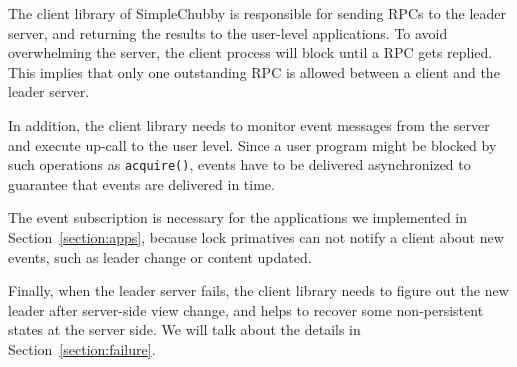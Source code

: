 The client library of SimpleChubby is responsible for sending RPCs to the
leader server, and returning the results to the user-level applications.
To avoid overwhelming the server, the client process will block until a RPC
gets replied. This implies that only one
outstanding RPC is allowed between a client and the leader server.

In addition, the client library needs to
monitor event messages from the server and execute up-call
to the user level.
Since a user program might be blocked by such operations
as \texttt{acquire()}, events have to be delivered asynchronized
to guarantee that events are delivered in time.

The event subscription is necessary
for the applications we implemented in Section~\ref{section:apps},
because lock primatives can not notify a client about new events,
such as leader change or content updated.

Finally, when the leader server fails, the client library needs to figure out
the new leader after server-side view change, and helps to recover some
non-persistent states at the server side. We will talk about the details in
Section~\ref{section:failure}.




